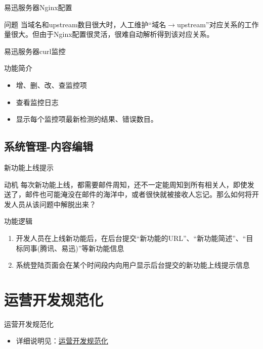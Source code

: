 \documentclass[CJK]{beamer}
\begin{document}
\begin{CJK*}{UTF8}{gbsn}
\begin{frame}{易迅服务器Nginx配置}
\begin{block}{问题}
当域名和upstream数目很大时，人工维护“域名$\rightarrow$upstream”对应关系的工作量很大。但由于Nginx配置很灵活，很难自动解析得到该对应关系。
\end{block}

\end{frame}

\begin{frame}{易迅服务器curl监控}
\begin{block}{功能简介}
\begin{itemize}
\item 增、删、改、查监控项
\item 查看监控日志
\item 显示每个监控项最新检测的结果、错误数目。
\end{itemize}
\end{block}
\end{frame}

\subsection{系统管理-内容编辑}

\begin{frame}{新功能上线提示}
\begin{block}{动机}
每次新功能上线，都需要邮件周知，还不一定能周知到所有相关人，即使发送了，邮件也可能淹没在邮件的海洋中，或者很快就被接收人忘记。那么如何将开发人员从该问题中解脱出来？
\end{block}
\begin{block}{功能逻辑}
\begin{enumerate}
\item 开发人员在上线新功能后，在后台提交“新功能的URL”、“新功能简述”、“目标同事(腾讯、易迅)”等新功能信息
\item 系统登陆页面会在某个时间段内向用户显示后台提交的新功能上线提示信息
\end{enumerate}
\end{block}
\end{frame}

\section{运营开发规范化}
\begin{frame}{运营开发规范化}
\begin{itemize}
\item 详细说明见：\href{http://youngsterxyf.github.io/2013/10/15/standardization-operation-development/}{运营开发规范化}
\end{itemize}
\end{frame}


\end{CJK*}
\end{document}
